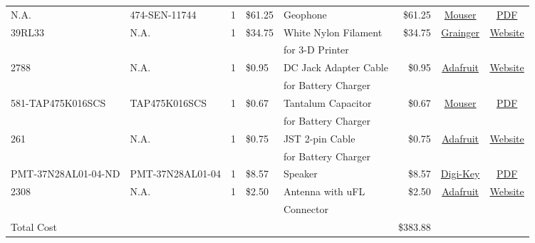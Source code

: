 \documentclass[12pt,landscape]{article}
\begin{document}
\begin{table}[H]
{\begin{tabular}{l|l|c|l|l|r|c|c}
		N.A. & 474-SEN-11744 & 1 & \$61.25 & Geophone & \$61.25 & \href{http://www.mouser.com/ProductDetail/SparkFun-Electronics/SEN-11744/?qs=\%2fha2pyFaduhLW6YoPw5UUIdTRP1X\%252btPruyfOHvl8\%2fY0\%3d}{Mouser} & \href{http://cdn.sparkfun.com/datasheets/Sensors/Accelerometers/SM-24\%20Brochure.pdf}{PDF} \\
    	 39RL33 & N.A. & 1 & \$34.75 & White Nylon Filament & \$34.75 & \href{https://www.grainger.com/product/FILABOT-White-Filament-39RL33}{Grainger} & \href{https://www.grainger.com/product/FILABOT-White-Filament-39RL33}{Website} \\
    	 & & & & for 3-D Printer & & \\
    	 2788 & N.A. & 1 & \$0.95 & DC Jack Adapter Cable & \$0.95 & \href{https://www.adafruit.com/products/2788}{Adafruit} & \href{https://www.adafruit.com/products/2788}{Website} \\
    	 & & & & for Battery Charger & & & \\
    	 581-TAP475K016SCS & TAP475K016SCS & 1 & \$0.67 & Tantalum Capacitor & \$0.67 & \href{http://www.mouser.com/ProductDetail/AVX/TAP475K016SCS/?qs=sGAEpiMZZMtZ1n0r9vR22d\%252b8XmbM9QM8L4TTXY3LGQ8\%3d}{Mouser} & \href{http://www.mouser.com/ds/2/40/tap-776819.pdf}{PDF} \\
    	 & & & & for Battery Charger & & & \\
    	 261 & N.A. & 1 & \$0.75 & JST 2-pin Cable & \$0.75 & \href{https://www.adafruit.com/product/261}{Adafruit} & \href{https://www.adafruit.com/product/261}{Website} \\
    	 & & & & for Battery Charger & & & \\
    	 	PMT-37N28AL01-04-ND & PMT-37N28AL01-04 & 1 & \$8.57 & Speaker & \$8.57 & \href{http://www.digikey.com/product-detail/en/peerless-by-tymphany/PMT-37N28AL01-04/PMT-37N28AL01-04-ND/6211115}{Digi-Key} & \href{http://www.tymphany.com/wp-content/themes/pathfinders/cache/pdfs/PMT-37N28AL01-04.pdf}{PDF} \\
        2308 & N.A. & 1 & \$2.50 & Antenna with uFL & \$2.50 & \href{https://www.adafruit.com/products/2308}{Adafruit} & \href{https://www.adafruit.com/products/2308}{Website} \\
    	 & & & & Connector & & & \\\hline
    	Total Cost & & & & & \$383.88 &
	\end{tabular}%
	}
    \label{tab:bom}
\end{table}
\end{document}
